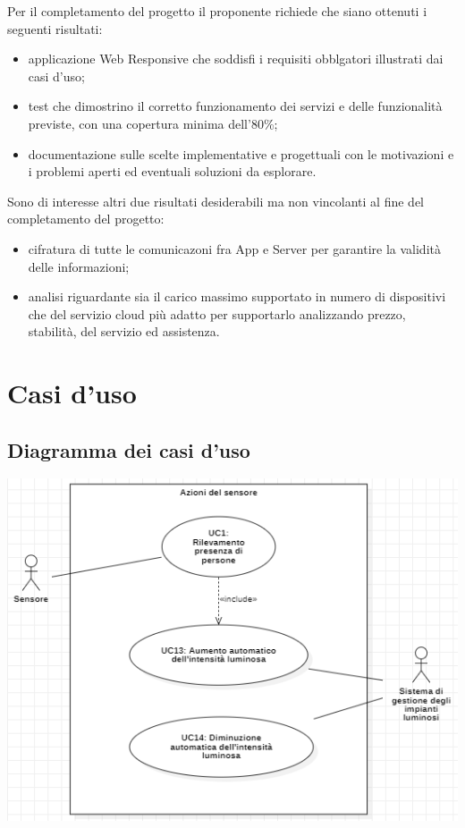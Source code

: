 \documentclass[a4paper, 12pt]{article}
\begin{document}
Per il completamento del progetto il proponente richiede che siano ottenuti i
seguenti risultati:
\begin{itemize}
    \item applicazione Web Responsive che soddisfi i requisiti obblgatori
    illustrati dai casi d'uso;
    \item test che dimostrino il corretto funzionamento dei servizi e delle
    funzionalità previste, con una copertura minima dell'80\%;
    \item documentazione sulle scelte implementative e progettuali con le
    motivazioni e i problemi aperti ed eventuali soluzioni da esplorare.
\end{itemize}
Sono di interesse altri due risultati desiderabili ma non vincolanti al fine del
completamento del progetto:
\begin{itemize}
    \item cifratura di tutte le comunicazoni fra App e Server per garantire la
    validità delle informazioni;
    \item analisi riguardante sia il carico massimo supportato in numero di
    dispositivi che del servizio cloud più adatto per supportarlo
    analizzando prezzo, stabilità, del servizio ed assistenza.
\end{itemize} 
\newpage
\section{Casi d'uso}

\subsection{Diagramma dei casi d'uso}

\includegraphics[scale=0.8]{diagramma_use_case_1.png}
\end{document}
